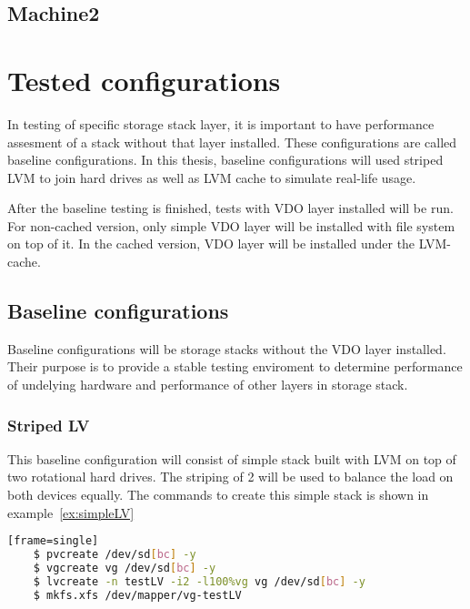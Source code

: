 \documentclass[
  color, %
  table, %
  lof,   %
  lot,   %
]{fithesis3}
\begin{document}
\section{Machine2}

\chapter{Tested configurations}
\label{storageConf}
In testing of specific storage stack layer, it is important to have performance assesment of a stack without that layer installed. These configurations are called baseline configurations. In this thesis, baseline configurations will used striped LVM to join hard drives as well as LVM cache to simulate real-life usage.

After the baseline testing is finished, tests with VDO layer installed will be run. For non-cached version, only simple VDO layer will be installed with file system on top of it. In the cached version, VDO layer will be installed under the LVM-cache.


\section{Baseline configurations}
Baseline configurations will be storage stacks without the VDO layer installed. Their purpose is to provide a stable testing enviroment to determine performance of undelying hardware and performance of other layers in storage stack.

\subsection{Striped LV}
This baseline configuration will consist of simple stack built with LVM on top of two rotational hard drives. The striping of 2 will be used to balance the load on both devices equally. The commands to create this simple stack is shown in example~\ref{ex:simpleLV}



\begin{lstlisting}[language=bash, label={ex:simpleLV}, caption={Creating striped logical volume}][frame=single]
    $ pvcreate /dev/sd[bc] -y
    $ vgcreate vg /dev/sd[bc] -y
    $ lvcreate -n testLV -i2 -l100%vg vg /dev/sd[bc] -y
    $ mkfs.xfs /dev/mapper/vg-testLV        
\end{lstlisting}
\end{document}
